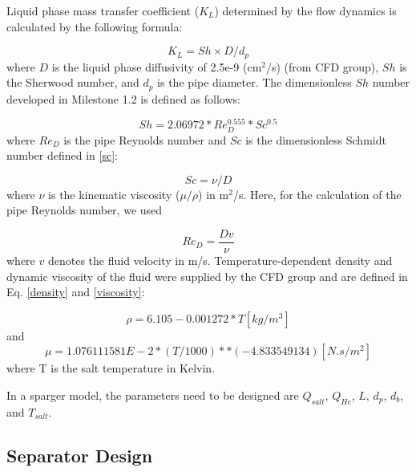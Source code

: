 \begin{itemize}
    Liquid phase mass transfer coefficient ($K_L$) determined by the flow 
    dynamics is calculated by the following formula:

    \begin{equation}\label{kl}
        K_L = Sh \times D / d_p
    \end{equation}
    where $D$ is the liquid phase diffusivity of 2.5e-9 (cm$^2$/s) (from CFD 
    group), $Sh$ is the Sherwood number, and $d_p$ is the pipe diameter. The 
    dimensionless $Sh$ number developed in Milestone 1.2 is defined as follows:

    \begin{equation}\label{sh}
        Sh = 2.06972 * Re_D^{0.555} * Sc^{0.5}
    \end{equation}
    where $Re_D$ is the pipe Reynolds number and $Sc$ is the dimensionless 
    Schmidt number defined in \ref{sc}:

    \begin{equation}\label{sc}
        Sc = \nu/D
    \end{equation}
    where $\nu$ is the kinematic viscosity ($\mu/\rho$) in m$^2$/s. Here, for 
    the calculation of the pipe Reynolds number, we used

    \begin{equation}\label{reynold}
        Re_D = \frac{Dv}{\nu}
    \end{equation}
    where $v$ denotes the fluid velocity in m/s. Temperature-dependent density 
    and dynamic viscosity of the fluid were supplied by the CFD group and are 
    defined in Eq. \ref{density} and \ref{viscosity}:

    \begin{equation}\label{density}
        \rho = 6.105 - 0.001272 * T [kg/m^3]
    \end{equation}
    and
    \begin{equation}\label{viscosity}
        \mu = 1.076111581E-2 * (T / 1000)**(-4.833549134) [N.s/m^2]
    \end{equation}
    where T is the salt temperature in Kelvin.

    In a sparger model, the parameters need to be designed are $Q_{salt}$, 
    $Q_{He}$, $L$, $d_p$, $d_b$, and $T_{salt}$.

\FloatBarrier

\subsection{Separator Design}


\end{itemize}
